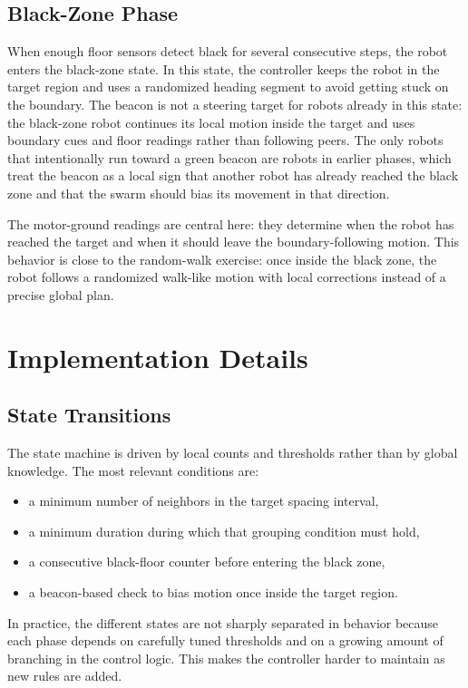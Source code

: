 \documentclass[runningheads]{llncs}
\begin{document}
\subsection{Black-Zone Phase}
When enough floor sensors detect black for several consecutive steps, the robot
enters the black-zone state. In this state, the controller keeps the robot in
the target region and uses a randomized heading segment to avoid getting stuck
on the boundary. The beacon is not a steering target for robots already in this
state: the black-zone robot continues its local motion inside the target and
uses boundary cues and floor readings rather than following peers. The only
robots that intentionally run toward a green beacon are robots in earlier
phases, which treat the beacon as a local sign that another robot has already
reached the black zone and that the swarm should bias its movement in that
direction.

The motor-ground readings are central here: they determine when the robot has
reached the target and when it should leave the boundary-following motion.
This behavior is close to the random-walk exercise: once inside the black zone,
the robot follows a randomized walk-like motion with local corrections instead
of a precise global plan.

\section{Implementation Details}
\subsection{State Transitions}
The state machine is driven by local counts and thresholds rather than by global
knowledge. The most relevant conditions are:
\begin{itemize}
	\item a minimum number of neighbors in the target spacing interval,
	\item a minimum duration during which that grouping condition must hold,
	\item a consecutive black-floor counter before entering the black zone,
	\item a beacon-based check to bias motion once inside the target region.
\end{itemize}

In practice, the different states are not sharply separated in behavior because
each phase depends on carefully tuned thresholds and on a growing amount of
branching in the control logic. This makes the controller harder to maintain as
new rules are added.
\end{document}
